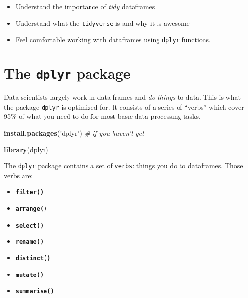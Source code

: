 \documentclass[]{book}
\newenvironment{Shaded}{\begin{snugshade}}{\end{snugshade}}
\newcommand{\CommentTok}[1]{\textcolor[rgb]{0.56,0.35,0.01}{\textit{#1}}}
\newcommand{\KeywordTok}[1]{\textcolor[rgb]{0.13,0.29,0.53}{\textbf{#1}}}
\newcommand{\NormalTok}[1]{#1}
\newcommand{\StringTok}[1]{\textcolor[rgb]{0.31,0.60,0.02}{#1}}
\providecommand{\tightlist}{%
  \setlength{\itemsep}{0pt}\setlength{\parskip}{0pt}}
\begin{document}
\begin{itemize}
\tightlist
\item
  Understand the importance of \emph{tidy} dataframes
\item
  Understand what the \texttt{tidyverse} is and why it is awesome
\item
  Feel comfortable working with dataframes using \texttt{dplyr} functions.
\end{itemize}

\hypertarget{the-dplyr-package}{%
\section*{\texorpdfstring{The \texttt{dplyr} package}{The dplyr package}}\label{the-dplyr-package}}

Data scientists largely work in data frames and \emph{do things} to data. This is what the package \texttt{dplyr} is optimized for. It consists of a series of ``verbs'' which cover 95\% of what you need to do for most basic data processing tasks.

\begin{Shaded}
\begin{Highlighting}[]
\KeywordTok{install.packages}\NormalTok{(}\StringTok{'dplyr'}\NormalTok{) }\CommentTok{# if you haven't yet}
\end{Highlighting}
\end{Shaded}

\begin{Shaded}
\begin{Highlighting}[]
\KeywordTok{library}\NormalTok{(dplyr)}
\end{Highlighting}
\end{Shaded}

The \texttt{dplyr} package contains a set of \texttt{verbs}: things you do to dataframes. Those verbs are:

\begin{itemize}
\tightlist
\item
  \textbf{\texttt{filter()}}~\\
\item
  \textbf{\texttt{arrange()}}~\\
\item
  \textbf{\texttt{select()}}~\\
\item
  \textbf{\texttt{rename()}}~\\
\item
  \textbf{\texttt{distinct()}}~\\
\item
  \textbf{\texttt{mutate()}}~\\
\item
  \textbf{\texttt{summarise()}}
\end{itemize}
\end{document}

